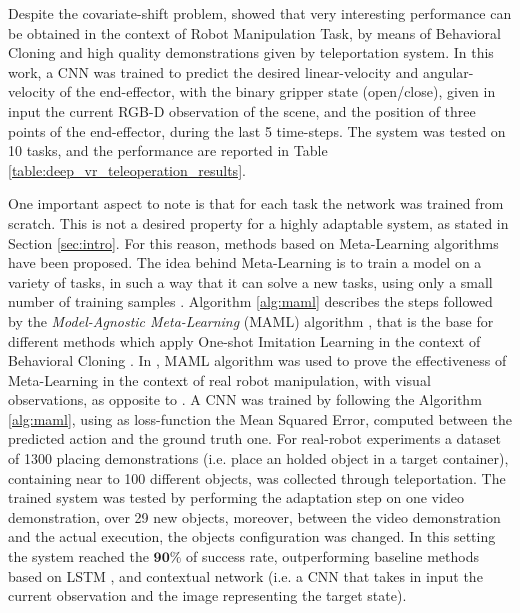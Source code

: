 Despite the covariate-shift problem, \cite{zhang2018deep_vr_teleoperation} showed that very interesting performance can be obtained in the context of Robot Manipulation Task, by means of Behavioral Cloning and high quality demonstrations given by teleportation system. In this work, a CNN was trained to predict the desired linear-velocity and angular-velocity of the end-effector, with the binary gripper state (open/close), given in input the current RGB-D observation of the scene, and the position of three points of the end-effector, during the last 5 time-steps. The system was tested on 10 tasks, and the performance are reported in Table \ref{table:deep_vr_teleoperation_results}.

\newline One important aspect to note is that for each task the network was trained from scratch. This is not a desired property for a highly adaptable system, as stated in Section \ref{sec:intro}. For this reason, methods based on Meta-Learning algorithms have been proposed. The idea behind Meta-Learning is to train a model on a variety of tasks, in such a way that it can solve a new tasks, using only a small number of training samples \cite{finn2017maml}. Algorithm \ref{alg:maml} describes the steps followed by the \textit{Model-Agnostic Meta-Learning} (MAML) algorithm \cite{finn2017maml}, that is the base for different methods which apply One-shot Imitation Learning in the context of Behavioral Cloning \cite{finn2017one_shot_visual_il,yu2018daml,yu2018one_shot_hil}.
\newline In \cite{finn2017one_shot_visual_il}, MAML algorithm was used to prove the effectiveness of Meta-Learning in the context of real robot manipulation, with visual observations, as opposite to \cite{duan2017one_shot_il}. A CNN was trained by following the Algorithm \ref{alg:maml}, using as loss-function the Mean Squared Error, computed between the predicted action and the ground truth one. For real-robot experiments a dataset of 1300 placing demonstrations (i.e. place an holded object in a target container), containing near to 100 different objects, was collected through teleportation. The trained system was tested by performing the adaptation step on one video demonstration, over 29 new objects, moreover, between the video demonstration and the actual execution, the objects configuration was changed. In this setting the system reached the $\mathbf{90\%}$ of success rate, outperforming baseline methods based on LSTM \cite{duan2017one_shot_il}, and contextual network (i.e. a CNN that takes in input the current observation and the image representing the target state).
